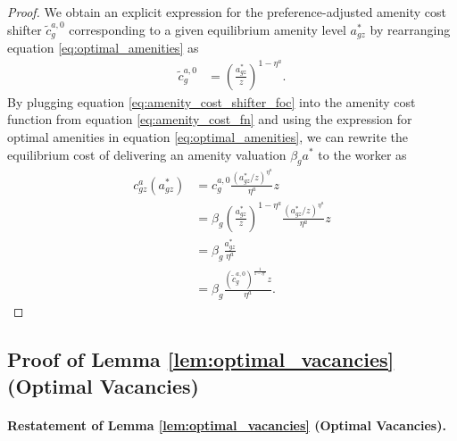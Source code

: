 \begin{proof}
    We obtain an explicit expression for the preference-adjusted amenity cost shifter $\tilde{c}_{g}^{a,0}$ corresponding to a given equilibrium amenity level $a_{gz}^{*}$ by rearranging equation \eqref{eq:optimal_amenities} as
    \begin{align}
        \tilde{c}_{g}^{a,0} &= \left( \frac{a_{gz}^{*}}{z} \right)^{1 - \eta^{a}}.
        \label{eq:amenity_cost_shifter_foc}
    \end{align}
    By plugging equation \eqref{eq:amenity_cost_shifter_foc} into the amenity cost function from equation \eqref{eq:amenity_cost_fn} and using the expression for optimal amenities in equation \eqref{eq:optimal_amenities}, we can rewrite the equilibrium cost of delivering an amenity valuation $\beta_{g}a^{*}$ to the worker as
    \begin{align}
        c_{gz}^{a}\left(a_{gz}^{*}\right) %
        &= c_{g}^{a,0} \frac{\left( a_{gz}^{*}/z \right)^{\eta^{a}}}{\eta^{a}} z \\
        &= \beta_{g} \left(\frac{a_{gz}^{*}}{z} \right)^{1 - \eta^{a}} \frac{\left( a_{gz}^{*}/z \right)^{\eta^{a}}}{\eta^{a}} z \\
        &= \beta_{g} \frac{ a_{gz}^{*} }{ \eta^{a} } \label{eq:optimal_amenity_cost} \\
        &= \beta_{g} \frac{ \left(\tilde{c}_{g}^{a,0} \right)^{\frac{1}{1 - \eta^{a}}} z }{ \eta^{a} }.
    \end{align}
\end{proof}


\subsection{Proof of Lemma \ref{lem:optimal_vacancies} (Optimal Vacancies)\label{app:proof_lemma_optimal_vacancies}}

\paragraph{Restatement of Lemma \ref{lem:optimal_vacancies} (Optimal Vacancies).}

\emph{%
    \LemmaOptimalVacancies%
}

